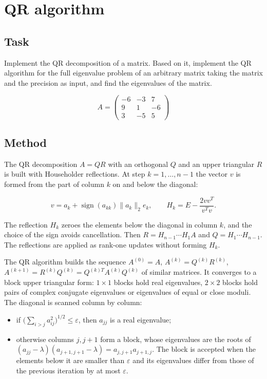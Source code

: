 \section{QR algorithm}

\subsection{Task}

Implement the QR decomposition of a matrix. Based on it, implement the QR algorithm for the full
eigenvalue problem of an arbitrary matrix taking the matrix and the precision as input, and find
the eigenvalues of the matrix.

\[
A = \begin{pmatrix}
-6 & -3 & 7 \\
9 & 1 & -6 \\
3 & -5 & 5
\end{pmatrix}
\]

\subsection{Method}

The QR decomposition $A = QR$ with an orthogonal $Q$ and an upper triangular $R$ is built with
Householder reflections. At step $k = 1, \ldots, n - 1$ the vector $v$ is formed from the part of
column $k$ on and below the diagonal:

\[
v = a_k + \operatorname{sign}(a_{kk}) \|a_k\|_2 e_k, \qquad
H_k = E - \frac{2 v v^T}{v^T v}.
\]

The reflection $H_k$ zeroes the elements below the diagonal in column $k$, and the choice of the
sign avoids cancellation. Then $R = H_{n-1} \cdots H_1 A$ and $Q = H_1 \cdots H_{n-1}$. The
reflections are applied as rank-one updates without forming $H_k$.

The QR algorithm builds the sequence $A^{(0)} = A$, $A^{(k)} = Q^{(k)} R^{(k)}$,
$A^{(k+1)} = R^{(k)} Q^{(k)} = Q^{(k)T} A^{(k)} Q^{(k)}$ of similar matrices. It converges to a
block upper triangular form: $1 \times 1$ blocks hold real eigenvalues, $2 \times 2$ blocks hold
pairs of complex conjugate eigenvalues or eigenvalues of equal or close moduli. The diagonal is
scanned column by column:

\begin{itemize}
    \item if $\bigl(\sum_{i>j} a_{ij}^2\bigr)^{1/2} \le \varepsilon$, then $a_{jj}$ is a real
    eigenvalue;
    \item otherwise columns $j, j + 1$ form a block, whose eigenvalues are the roots of
    $(a_{jj} - \lambda)(a_{j+1,j+1} - \lambda) = a_{j,j+1} a_{j+1,j}$. The block is accepted when
    the elements below it are smaller than $\varepsilon$ and its eigenvalues differ from those of
    the previous iteration by at most $\varepsilon$.
\end{itemize}

